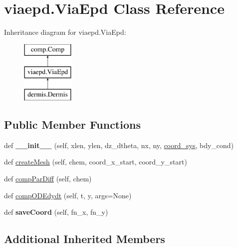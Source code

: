 \hypertarget{classviaepd_1_1ViaEpd}{}\section{viaepd.\+Via\+Epd Class Reference}
\label{classviaepd_1_1ViaEpd}
Inheritance diagram for viaepd.\+Via\+Epd\+:\begin{figure}[H]
\begin{center}
\leavevmode
\includegraphics[height=3.000000cm]{classviaepd_1_1ViaEpd}
\end{center}
\end{figure}
\subsection*{Public Member Functions}
\begin{DoxyCompactItemize}
\item 
def {\bfseries \+\_\+\+\_\+init\+\_\+\+\_\+} (self, xlen, ylen, dz\+\_\+dtheta, nx, ny, \hyperlink{classcomp_1_1Comp_ae00e132d485d50acaf13977284fd9051}{coord\+\_\+sys}, bdy\+\_\+cond)\hypertarget{classviaepd_1_1ViaEpd_a85a353c2e5a5671e08c38b82dad3544a}{}\label{classviaepd_1_1ViaEpd_a85a353c2e5a5671e08c38b82dad3544a}

\item 
def \hyperlink{classviaepd_1_1ViaEpd_aca401fb9bc87b50c59ef25b157227727}{create\+Mesh} (self, chem, coord\+\_\+x\+\_\+start, coord\+\_\+y\+\_\+start)
\item 
def \hyperlink{classviaepd_1_1ViaEpd_ac206abcf43729b9906dc75cbd49283fe}{comp\+Par\+Diff} (self, chem)
\item 
def \hyperlink{classviaepd_1_1ViaEpd_ab95e617ec1b7f741a2ae058d226ec66c}{comp\+O\+D\+Edydt} (self, t, y, args=None)
\item 
def {\bfseries save\+Coord} (self, fn\+\_\+x, fn\+\_\+y)\hypertarget{classviaepd_1_1ViaEpd_a99b4ca36f663b30b87a13a51b9b62776}{}\label{classviaepd_1_1ViaEpd_a99b4ca36f663b30b87a13a51b9b62776}

\end{DoxyCompactItemize}
\subsection*{Additional Inherited Members}



